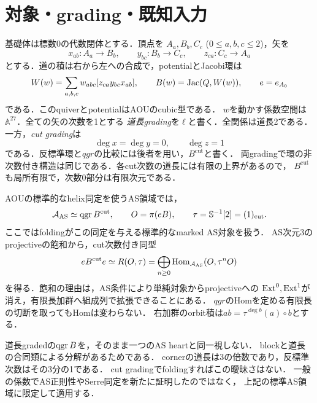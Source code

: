 \section{対象・grading・既知入力}
基礎体は標数0の代数閉体とする．頂点を
$A_a,B_b,C_c$ ($0\le a,b,c\le2$)，矢を
\[
 x_{ab}:A_a\to B_b,\qquad y_{bc}:B_b\to C_c,\qquad z_{ca}:C_c\to A_a
\]
とする．道の積は右から左への合成で，potentialとJacobi環は
\[
 W(w)=\sum_{a,b,c}w_{abc}[z_{ca}y_{bc}x_{ab}],\qquad
 B(w)=\operatorname{Jac}(Q,W(w)),\qquad e=e_{A_0}
\]
である．このquiverとpotentialはAOU\cite[\S4]{AOU}のcubic型である．
$w$を動かす係数空間は$\mathbb A^{27}$．全ての矢の次数を1とする
\emph{道長grading}を$\ell$と書く．全関係は道長2である．
一方，\emph{cut grading}は
\[
 \deg x=\deg y=0,\qquad\deg z=1
\]
である．反標準環と$qgr$の比較には後者を用い，$B^{\mathrm{cut}}$と書く．
両gradingで環の非次数付き構造は同じである．各cut次数の道長には有限の上界があるので，
$B^{\mathrm{cut}}$も局所有限で，次数0部分は有限次元である．

AOU\cite[(3.19), (4.9), (4.13)]{AOU}の標準的なhelix同定を使うAS領域では，
\[
 \mathcal A_{\mathrm{AS}}\simeq\operatorname{qgr} B^{\mathrm{cut}},\qquad
 O=\pi(eB),\qquad \tau=\mathbb S^{-1}[2]=(1)_{\mathrm{cut}}.
\]
ここではfoldingがこの同定を与える標準的なmarked AS対象を扱う．
AS次元3のprojectiveの飽和から，cut次数付き同型
\begin{equation}\label{eq:orbit}
 eB^{\mathrm{cut}}e\simeq R(O,\tau)
 =\bigoplus_{n\ge0}\operatorname{Hom}_{\mathcal A_{\mathrm{AS}}}(O,\tau^nO)
\end{equation}
を得る．飽和の理由は，AS条件により単純対象からprojectiveへの
$\operatorname{Ext}^0,\operatorname{Ext}^1$が消え，有限長加群へ組成列で拡張できることにある．
$qgr$のHomを定める有限長の切断を取ってもHomは変わらない．
右加群のorbit積は$ab=\tau^{\deg b}(a)\circ b$とする．

\begin{remark}
道長gradedの$\operatorname{qgr} B$を，そのまま一つのAS heartと同一視しない．
blockと道長の合同類による分解があるためである．
cornerの道長は3の倍数であり，反標準次数はその3分の1である．
cut gradingでfoldingすればこの曖昧さはない．
一般の係数でAS正則性やSerre同定を新たに証明したのではなく，
上記の標準AS領域に限定して適用する．
\end{remark}

